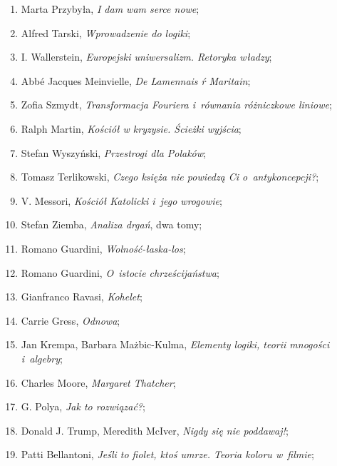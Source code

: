 \documentclass[a4paper,11pt]{article}
\begin{document}
\begin{enumerate}
\item Marta Przybyła, \textit{I dam wam serce nowe};

\item Alfred Tarski, \textit{Wprowadzenie do logiki};

\item I. Wallerstein, \textit{Europejski uniwersalizm. Retoryka władzy};

\item Abbé Jacques Meinvielle, \textit{De Lamennais ŕ Maritain};

\item Zofia Szmydt, \textit{Transformacja Fouriera i~równania różniczkowe
    liniowe};


\item Ralph Martin, \textit{Kościół w kryzysie. Ścieżki wyjścia};


\item Stefan Wyszyński, \textit{Przestrogi dla Polaków};

\item Tomasz Terlikowski, \textit{Czego księża nie powiedzą Ci
    o~antykoncepcji?};

\item V. Messori, \textit{Kościół Katolicki i~jego wrogowie};

\item Stefan Ziemba, \textit{Analiza drgań}, dwa tomy;

\item Romano Guardini, \textit{Wolność-łaska-los};

\item Romano Guardini, \textit{O~istocie chrześcijaństwa};

\item Gianfranco Ravasi, \textit{Kohelet};

\item Carrie Gress, \textit{Odnowa};

\item Jan Krempa, Barbara Mażbic-Kulma, \textit{Elementy logiki, teorii
    mnogości i~algebry};

\item Charles Moore, \textit{Margaret Thatcher};

\item G. Polya, \textit{Jak to rozwiązać?};

\item Donald J. Trump, Meredith McIver, \textit{Nigdy się nie poddawaj!};

\item Patti Bellantoni, \textit{Jeśli to fiolet, ktoś umrze. Teoria koloru
    w~filmie};


\end{enumerate}
\end{document}

